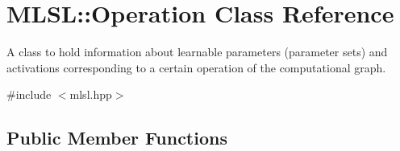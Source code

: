 \hypertarget{classMLSL_1_1Operation}{\section{M\-L\-S\-L\-:\-:Operation Class Reference}
\label{classMLSL_1_1Operation}
}


A class to hold information about learnable parameters (parameter sets) and activations corresponding to a certain operation of the computational graph.  




{\ttfamily \#include $<$mlsl.\-hpp$>$}

\subsection*{Public Member Functions}
